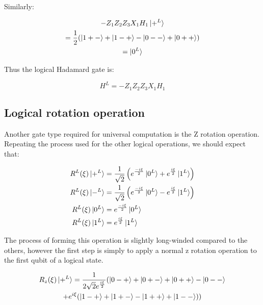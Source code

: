 Similarly:

\begin{multline}
- Z_{1} Z_{2} Z_{3} X_{1} H_{1} \ket{+^{L}} \\
= \frac{1}{2}(\ket{1+-} + \ket{1-+} - \ket{0--} + \ket{0++}) \\
= \ket{0^{L}} \\
\end{multline}

Thus the logical Hadamard gate is:

\begin{equation}
H^{L} = - Z_{1} Z_{2} Z_{3} X_{1} H_{1}
\end{equation}


\subsection{Logical rotation operation}

Another gate type required for universal computation is the Z rotation operation. Repeating the process used for the other logical operations, we should expect that:

\begin{align*}
R^{L}(\xi) \ket{+^{L}} &= \frac{1}{\sqrt{2}}\left(e^{\frac{-i \xi}{2}}\ket{0^{L}} + e^{\frac{i \xi}{2}}\ket{1^{L}}\right)
\\ R^{L}(\xi) \ket{-^{L}} &= \frac{1}{\sqrt{2}}\left(e^{\frac{-i \xi}{2}}\ket{0^{L}} - e^{\frac{i \xi}{2}}\ket{1^{L}}\right) \\
R^{L}(\xi) \ket{0^{L}} &= e^{\frac{- i \xi}{2}}\ket{0^{L}} \\ 
R^{L}(\xi) \ket{1^{L}} &= e^{\frac{i \xi}{2}}\ket{1^{L}} \\
\end{align*}

The process of forming this operation is slightly long-winded compared to the others, however the first step is simply to apply a normal z rotation operation to the first qubit of a logical state.

\begin{multline*}
R_{z}(\xi)\ket{+^{L}} = \frac{1}{2 \sqrt{2} e^{\frac{i \xi}{2}}}(\ket{0-+} +\ket{0+-} + \ket{0++} - \ket{0--} \\
+ e^{i \xi}(\ket{1-+} +\ket{1+-} - \ket{1++} + \ket{1--})) \\
\end{multline*}

